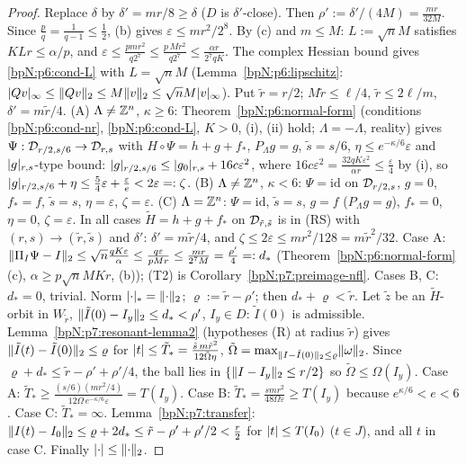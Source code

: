 \begin{proof}
\label{stepN:p7:p2-red} Replace $\delta$ by $\delta'=mr/8\ge\delta$ ($D$ is $\delta'$-close). Then $\rho':=\delta'/(4M)=\frac{mr}{32M}$. Since $\frac pq=\frac1{q-1}\le\frac12$, (b) gives $\varepsilon\le mr^2/2^8$. By (c) and $m\le M$: $L:=\sqrt nM$ satisfies $KLr\le\alpha/p$, and $\varepsilon\le\frac{pmr^2}{q2^7}\le\frac{p\,Mr^2}{q2^7}\le\frac{\alpha r}{2^7qK}$. The complex Hessian bound gives \ref{bpN:p6:cond-L} with $L=\sqrt nM$ (Lemma~\ref{bpN:p6:lipschitz}: $\lvert Qv\rvert_\infty\le\lVert Qv\rVert_2\le M\lVert v\rVert_2\le\sqrt nM\lvert v\rvert_\infty$). Put $\tilde r=r/2$; $M\tilde r\le\ell/4$, $\tilde r\le2\ell/m$, $\delta'=m\tilde r/4$.
\label{stepN:p7:p2-cases} (A) $\Lambda\ne\mathbb{Z}^n$, $\kappa\ge6$: Theorem~\ref{bpN:p6:normal-form} (conditions \ref{bpN:p6:cond-nr}, \ref{bpN:p6:cond-L}, $K>0$, (i), (ii) hold; $\Lambda=-\Lambda$, reality) gives $\Psi:\mathcal D_{r/2,s/6}\to\mathcal D_{r,s}$ with $H\circ\Psi=h+g+f_*$, $P_\Lambda g=g$, $\tilde s=s/6$, $\eta\le e^{-\kappa/6}\varepsilon$ and $\lvert g\rvert_{r,s}$-type bound: $\lvert g\rvert_{r/2,s/6}\le\lvert g_0\rvert_{r,s}+16c\varepsilon^2$, where $16c\varepsilon^2=\frac{32qK\varepsilon^2}{\alpha r}\le\frac\varepsilon4$ by (i), so $\lvert g\rvert_{r/2,s/6}+\eta\le\frac54\varepsilon+\frac\varepsilon e<2\varepsilon=:\zeta$.
(B) $\Lambda\ne\mathbb{Z}^n$, $\kappa<6$: $\Psi=\mathrm{id}$ on $\mathcal D_{r/2,s}$, $g=0$, $f_*=f$, $\tilde s=s$, $\eta=\varepsilon$, $\zeta=\varepsilon$.
(C) $\Lambda=\mathbb{Z}^n$: $\Psi=\mathrm{id}$, $\tilde s=s$, $g=f$ ($P_\Lambda g=g$), $f_*=0$, $\eta=0$, $\zeta=\varepsilon$.
In all cases $\tilde H=h+g+f_*$ on $\mathcal D_{\tilde r,\tilde s}$ is in (RS) with $(r,s)\to(\tilde r,\tilde s)$ and $\delta'$: $\delta'=m\tilde r/4$, and $\zeta\le2\varepsilon\le mr^2/128=m\tilde r^2/32$.
\label{stepN:p7:p2-t12} Case A: $\lVert \Pi_I\Psi-I\rVert_2\le\sqrt n\frac{qK\varepsilon}\alpha\le\frac{q\varepsilon}{pMr}\le\frac{mr}{2^7M}=\frac{\rho'}4=:d_*$ (Theorem~\ref{bpN:p6:normal-form}(c), $\alpha\ge p\sqrt nMKr$, (b)); (T2) is Corollary~\ref{bpN:p7:preimage-nfl}. Cases B, C: $d_*=0$, trivial. Norm $\lvert \cdot\rvert_*=\lVert \cdot\rVert_2$; $\varrho:=\tilde r-\rho'$; then $d_*+\varrho<\tilde r$.
\label{stepN:p7:p2-t3} Let $\tilde z$ be an $\tilde H$-orbit in $W_{\tilde r}$, $\lVert \tilde I(0)-I_y\rVert_2\le d_*<\rho'$, $I_y\in D$: $\tilde I(0)$ is admissible. Lemma~\ref{bpN:p7:resonant-lemma2} (hypotheses (R) at radius $\tilde r$) gives $\lVert \tilde I(t)-\tilde I(0)\rVert_2\le\varrho$ for $\lvert t\rvert\le\tilde T_*=\frac{\tilde s\,m\tilde r^2}{12\tilde\Omega\eta}$, $\tilde\Omega=\max_{\lVert I-\tilde I(0)\rVert_2\le\varrho}\lVert \omega\rVert_2$. Since $\varrho+d_*\le\tilde r-\rho'+\rho'/4$, the ball lies in $\{\lVert I-I_y\rVert_2\le r/2\}$ so $\tilde\Omega\le\Omega(I_y)$. Case A: $\tilde T_*\ge\frac{(s/6)(mr^2/4)}{12\Omega\,e^{-\kappa/6}\varepsilon}=T(I_y)$. Case B: $\tilde T_*=\frac{smr^2}{48\Omega\varepsilon}\ge T(I_y)$ because $e^{\kappa/6}<e<6$. Case C: $\tilde T_*=\infty$.
\label{stepN:p7:p2-concl} Lemma~\ref{bpN:p7:transfer}: $\lVert I(t)-I_0\rVert_2\le\varrho+2d_*\le\tilde r-\rho'+\rho'/2<\frac r2$ for $\lvert t\rvert\le T(I_0)$ ($t\in J$), and all $t$ in case C. Finally $\lvert \cdot\rvert\le\lVert \cdot\rVert_2$.
\end{proof}

